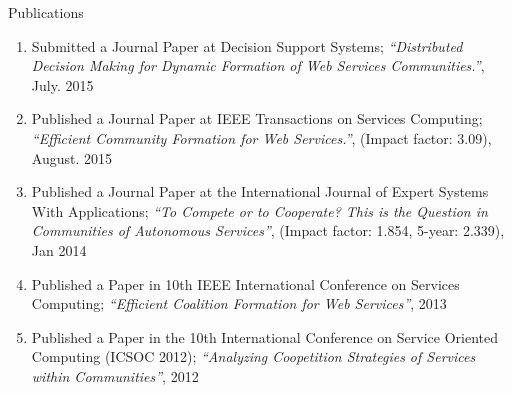 \documentclass{beamer}
\begin{document}
\begin{frame}{Publications}
    \scriptsize
    \begin{enumerate}
        \item Submitted a Journal Paper at Decision Support Systems; \emph{``Distributed Decision Making for Dynamic Formation of Web Services Communities.''}, July. 2015
        \item Published a Journal Paper at IEEE Transactions on Services Computing; \emph{``Efficient Community Formation for Web Services.''}, (Impact factor: 3.09), August. 2015
        \item Published a Journal Paper at the International Journal of Expert Systems With Applications; \emph{``To Compete or to Cooperate? This is the Question in Communities of Autonomous Services''},  (Impact factor: 1.854, 5-year: 2.339), Jan 2014
        \item Published a Paper in 10th IEEE International Conference on Services Computing; \emph{``Efficient Coalition Formation for Web Services''}, 2013
        \item Published a Paper in the 10th International Conference on Service Oriented Computing (ICSOC 2012); \emph{``Analyzing Coopetition Strategies of Services within Communities''}, 2012
    \end{enumerate}
\end{frame}

%
\end{document}
